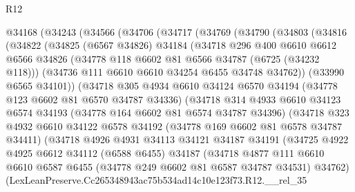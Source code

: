 \begin{lexlean}{R12}
\begin{coremodule}
  @34168
    (@34243
      (@34566
        (@34706
          (@34717
            (@34769
              (@34790
                (@34803
                  (@34816
                    (@34822
                      (@34825
                        (@6567 @34826)
                        @34184
                        (@34718
                          @296
                          @400
                          @6610
                          @6612
                          @6566
                          @34826
                          (@34778 @118 @6602 @81 @6566 @34787 (@6725 (@34232 @118)))
                          (@34736 @111 @6610 @6610 @34254 @6455 @34748 @34762))
                        (@33990 @6565 @34101))
                      (@34718
                        @305
                        @4934
                        @6610
                        @34124
                        @6570
                        @34194
                        (@34778 @123 @6602 @81 @6570 @34787 @34336)
                        (@34718
                          @314
                          @4933
                          @6610
                          @34123
                          @6574
                          @34193
                          (@34778 @164 @6602 @81 @6574 @34787 @34396)
                          (@34718
                            @323
                            @4932
                            @6610
                            @34122
                            @6578
                            @34192
                            (@34778 @169 @6602 @81 @6578 @34787 @34411)
                            (@34718
                              @4926
                              @4931
                              @34113
                              @34121
                              @34187
                              @34191
                              (@34725
                                @4922
                                @4925
                                @6612
                                @34112
                                (@6588 @6455)
                                @34187
                                (@34718
                                  @4877
                                  @111
                                  @6610
                                  @6610
                                  @6587
                                  @6455
                                  (@34778 @249 @6602 @81 @6587 @34787 @34531)
                                  @34762)
                                (LexLeanPreserve.Cc265348943ac75b534ad14c10e123f73.R12.__rel_35

\end{coremodule}
\end{lexlean}
